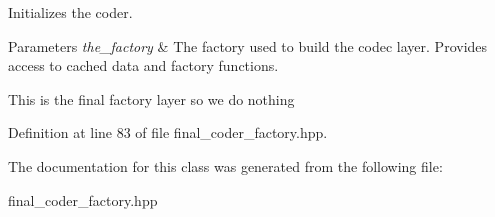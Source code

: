 Initializes the coder. 


\begin{DoxyParams}{Parameters}
{\em the\-\_\-factory} & The factory used to build the codec layer. Provides access to cached data and factory functions. \\
\hline
\end{DoxyParams}
This is the final factory layer so we do nothing 

Definition at line 83 of file final\-\_\-coder\-\_\-factory.\-hpp.



The documentation for this class was generated from the following file\-:\begin{DoxyCompactItemize}
\item 
final\-\_\-coder\-\_\-factory.\-hpp\end{DoxyCompactItemize}
